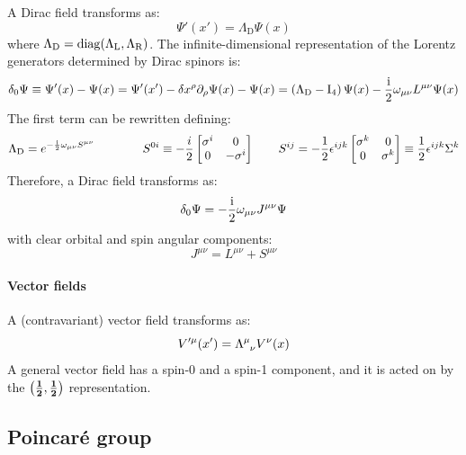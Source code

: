 A Dirac field transforms as:
\begin{equation}
  \Psi'(x') = \Lambda_\text{D} \Psi(x)
\end{equation}
where $ \Lambda_\text{D} = \operatorname{diag}(\Lambda_\text{L} , \Lambda_\text{R}) $. The infinite-dimensional representation of the Lorentz generators determined by Dirac spinors is:
\begin{equation*}
  \delta_0 \Psi \equiv \Psi'(x) - \Psi(x) = \Psi'(x') - \delta x^\rho \partial_\rho \Psi(x) - \Psi(x) = \left( \Lambda_\text{D} - \mathrm{I}_4 \right) \Psi(x) - \frac{\mathrm{i}}{2} \omega_{\mu \nu} L^{\mu \nu} \Psi(x)
\end{equation*}
The first term can be rewritten defining:
\begin{equation*}
  \Lambda_\text{D} = e^{-\frac{\mathrm{i}}{2} \omega_{\mu \nu} S^{\mu \nu}}
  \qquad \qquad
  S^{0i} \equiv - \frac{i}{2}
  \begin{bmatrix}
    \sigma^i & 0 \\ 0 & -\sigma^i
  \end{bmatrix}
  \qquad
  S^{ij} = - \frac{1}{2} \epsilon^{ijk}
  \begin{bmatrix}
    \sigma^k & 0 \\ 0 & \sigma^k
  \end{bmatrix}
  \equiv \frac{1}{2} \epsilon^{ijk} \Sigma^k
\end{equation*}
Therefore, a Dirac field transforms as:
\begin{equation}
  \delta_0 \Psi = - \frac{\mathrm{i}}{2} \omega_{\mu \nu} J^{\mu \nu} \Psi
  \label{eq:dir-field-change}
\end{equation}
with clear orbital and spin angular components:
\begin{equation}
  J^{\mu \nu} = L^{\mu \nu} + S^{\mu \nu}
  \label{eq:dir-field-tot-ang-mom}
\end{equation}

\paragraph{Vector fields}

A (contravariant) vector field transforms as:
\begin{equation}
  V'^\mu(x') = \tensor{\Lambda}{^\mu_\nu} V^\nu(x)
\end{equation}
A general vector field has a spin-0 and a spin-1 component, and it is acted on by the $ \mathbf{\left( \frac{1}{2},\frac{1}{2} \right)} $ representation.

\subsection{Poincaré group}

